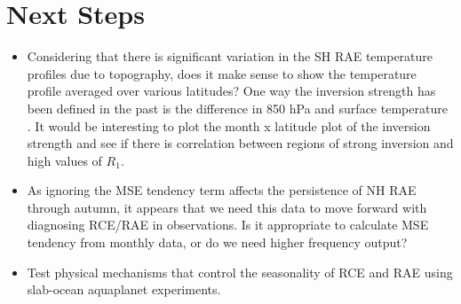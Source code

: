 \documentclass[11pt]{article}
\begin{document}
\section{Next Steps}
\label{sec:org67bc814}
\begin{itemize}
\item Considering that there is significant variation in the SH RAE temperature profiles due to topography, does it make sense to show the temperature profile averaged over various latitudes? One way the inversion strength has been defined in the past is the difference in 850 hPa and surface temperature \cite{medeiros2011}. It would be interesting to plot the month x latitude plot of the inversion strength and see if there is correlation between regions of strong inversion and high values of \(R_1\).
\item As ignoring the MSE tendency term affects the persistence of NH RAE through autumn, it appears that we need this data to move forward with diagnosing RCE/RAE in observations. Is it appropriate to calculate MSE tendency from monthly data, or do we need higher frequency output?
\item Test physical mechanisms that control the seasonality of RCE and RAE using slab-ocean aquaplanet experiments.
\end{itemize}



\end{document}
